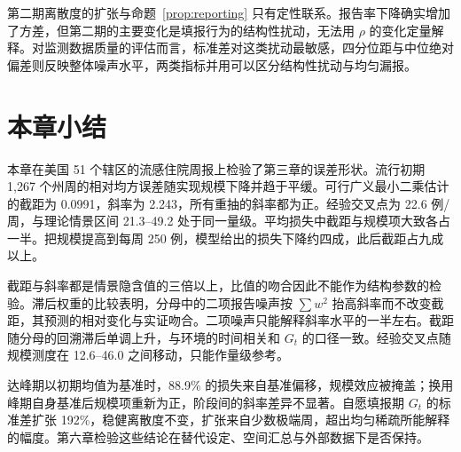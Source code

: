 第二期离散度的扩张与命题~\ref{prop:reporting} 只有定性联系。报告率下降确实增加了方差，但第二期的主要变化是填报行为的结构性扰动，无法用 $\rho$ 的变化定量解释。对监测数据质量的评估而言，标准差对这类扰动最敏感，四分位距与中位绝对偏差则反映整体噪声水平，两类指标并用可以区分结构性扰动与均匀漏报。

\section{本章小结}
\label{sec:emp-summary}

本章在美国 51 个辖区的流感住院周报上检验了第三章的误差形状。流行初期 1,267 个州周的相对均方误差随实现规模下降并趋于平缓。可行广义最小二乘估计的截距为 0.0991，斜率为 2.243，所有重抽的斜率都为正。经验交叉点为 22.6 例/周，与理论情景区间 21.3--49.2 处于同一量级。平均损失中截距与规模项大致各占一半。把规模提高到每周 250 例，模型给出的损失下降约四成，此后截距占九成以上。

截距与斜率都是情景隐含值的三倍以上，比值的吻合因此不能作为结构参数的检验。滞后权重的比较表明，分母中的二项报告噪声按 $\sum w^2$ 抬高斜率而不改变截距，其预测的相对变化与实证吻合。二项噪声只能解释斜率水平的一半左右。截距随分母的回溯滞后单调上升，与环境的时间相关和 $G_t$ 的口径一致。经验交叉点随规模测度在 12.6--46.0 之间移动，只能作量级参考。

达峰期以初期均值为基准时，88.9\% 的损失来自基准偏移，规模效应被掩盖；换用峰期自身基准后规模项重新为正，阶段间的斜率差异不显著。自愿填报期 $G_t$ 的标准差扩张 192\%，稳健离散度不变，扩张来自少数极端周，超出均匀稀疏所能解释的幅度。第六章检验这些结论在替代设定、空间汇总与外部数据下是否保持。
